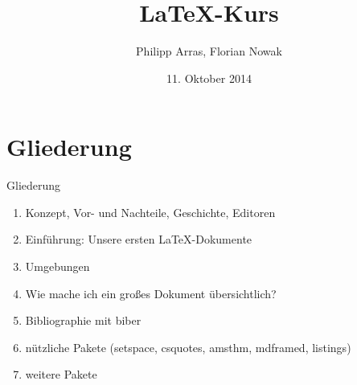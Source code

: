 \documentclass[11pt]{beamer}
\author{Philipp Arras, Florian Nowak}
\title{\LaTeX -Kurs}
\date{11. Oktober 2014}
\begin{document}
\begin{frame}
\titlepage
\end{frame}


\section{Gliederung}
\begin{frame}{Gliederung}
\begin{enumerate}
\item Konzept, Vor- und Nachteile, Geschichte, Editoren
\item Einführung: Unsere ersten LaTeX-Dokumente
\item Umgebungen
\item Wie mache ich ein großes Dokument übersichtlich?
\item Bibliographie mit biber
\item nützliche Pakete (setspace, csquotes, amsthm, mdframed, listings)
\item weitere Pakete
\end{enumerate}
\end{frame}
\end{document}
